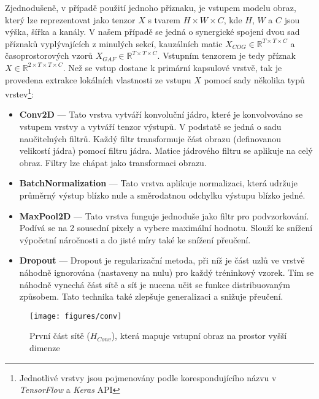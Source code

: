 Zjednodušeně, v případě použití jednoho příznaku, je vstupem modelu obraz, který
lze reprezentovat jako tenzor $X$ s tvarem $H \times W \times C$, kde $H$, $W$ a
$C$ jsou výška, šířka a kanály. V našem případě se jedná o synergické spojení
dvou sad příznaků vyplývajících z minulých sekcí, kauzálních matic $X_{COG} \in
    \mathbb{R}^{T \times T \times C}$ a časoprostorových vzorů $X_{GAF} \in
    \mathbb{R}^{T \times T \times C}$. Vstupním tenzorem je tedy příznak $X \in
    \mathbb{R}^{2 \times T \times T \times C}$. Než se vstup dostane k primární
kapsulové vrstvě, tak je provedena extrakce lokálních vlastnosti ze vstupu $X$
pomocí sady několika typů vrstev\footnote{Jednotlivé vrstvy jsou pojmenovány
    podle korespondujícího názvu v \textit{TensorFlow} a \textit{Keras} API}:
\begin{itemize}
    \item \textbf{Conv2D} --- Tato vrstva vytváří konvoluční jádro, které je
          konvolvováno se vstupem vrstvy a vytváří tenzor výstupů. V podstatě se jedná
          o sadu naučitelných filtrů. Každý filtr transformuje část obrazu
          (definovanou velikostí jádra) pomocí filtru jádra. Matice jádrového filtru
          se aplikuje na celý obraz. Filtry lze chápat jako transformaci obrazu.
    \item \textbf{BatchNormalization} --- Tato vrstva aplikuje normalizaci,
          která udržuje průměrný výstup blízko nule a směrodatnou odchylku výstupu
          blízko jedné.
    \item \textbf{MaxPool2D} --- Tato vrstva funguje jednoduše jako filtr pro
          podvzorkování. Podívá se na 2 sousední pixely a vybere maximální hodnotu.
          Slouží ke snížení výpočetní náročnosti a do jisté míry také ke snížení
          přeučení.
    \item \textbf{Dropout} --- Dropout je regularizační metoda, při níž je část
          uzlů ve vrstvě náhodně ignorována (nastaveny na nulu) pro každý
          tréninkový vzorek. Tím se náhodně vynechá část sítě a síť je nucena
          učit se funkce distribuovaným způsobem. Tato technika také zlepšuje
          generalizaci a snižuje přeučení.
\end{itemize}

\begin{figure}[h]
    \begin{center}
        \texttt{[image: figures/conv]}
        \caption{První část sítě ($H_{Conv}$), která mapuje vstupní obraz na
            prostor vyšší dimenze}
        \label{fig:conv}
    \end{center}
\end{figure}

